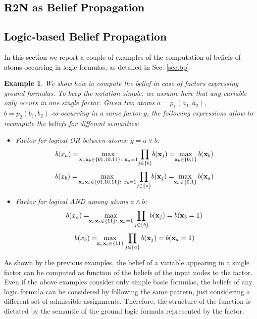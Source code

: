 \documentclass[journal]{IEEEtran}
\newtheorem{example}{Example}
\newcommand{\ar}[1]{\textcolor{black}{#1}}
\begin{document}
\ar{\section*{R2N as Belief Propagation}
\subsection*{Logic-based Belief Propagation}
In this section we report a couple of examples of the computation of beliefs of atoms occurring in logic formulas, as detailed in Sec. \ref{sec:bp}.}
\begin{example}
We show how to compute the belief in case of factors expressing ground formulas. To keep the notation simple, we assume here that any variable only occurs in one single factor. %
Given two atoms $a = p_1(a_1,a_2)$, $b = p_2(b_1,b_2)$ co-occurring in a same factor $g$, the following expressions allow to recompute the beliefs for different semantics:
\begin{itemize}
\item Factor for logical OR between atoms: $g = a \lor b$:
\[
b(x_a)= \! \displaystyle\max_{{\bf x}_a{\bf x}_b \in \{01,10,11\}:\ {\bf x}_a=1} \!\prod_{j \in \{b\}} \!b({\bf x}_j) = \!\! \displaystyle\max_{{\bf x}_b\in\{0,1\}} b({\bf x}_b)
\]
\[
b(x_b)= \! \displaystyle\max_{{\bf x}_a{\bf x}_b \in \{01,10,11\}:\ x_b=1} \!\prod_{j \in \{a\}} \!b({\bf x}_j) = \!\! \displaystyle\max_{{\bf x}_a\in\{0,1\}} b({\bf x}_a)
\]
\item Factor for logical AND among atoms $a \land b$: %
\[
b(x_a) =\!\! \displaystyle\max_{{\bf x}_a{\bf x}_b \in \{11\}:\ {\bf x}_a=1} \prod_{j\in \{b\}} b({\bf x}_j) = b({\bf x}_b=1)
\]
\[
b(x_b) = \!\! \displaystyle\max_{{\bf x}_a{\bf x}_b \in \{11\}} \prod_{j\in \{a\}} b({\bf x}_j) = b({\bf x}_a=1)
\]
\end{itemize}
\end{example}

As shown by the previous examples, the belief of a variable appearing in a single factor can be computed as function of the beliefs of the input nodes to the factor. Even if the above examples consider only simple basic formulas, the beliefs of any logic formula can be considered by following the same pattern, just considering a different set of admissible assignments. Therefore, the structure of the function is dictated by the semantic of the ground logic formula represented by the factor.
\end{document}
